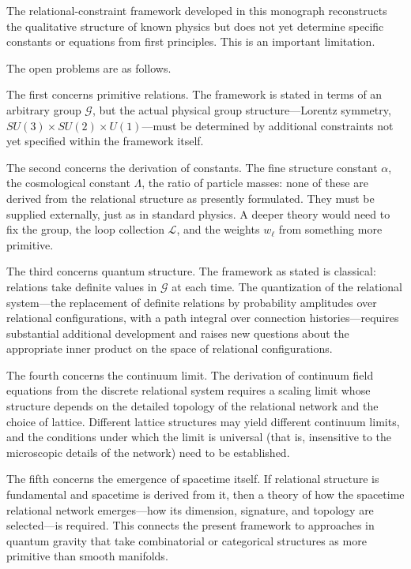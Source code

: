 \documentclass[12pt,a4paper,openany]{book}
\theoremstyle{plain}
\theoremstyle{definition}
\theoremstyle{remark}
\newcommand{\GG}{\mathcal{G}}
\begin{document}
The relational-constraint framework developed in this monograph reconstructs the qualitative structure of known physics but does not yet determine specific constants or equations from first principles. This is an important limitation.

The open problems are as follows.

The first concerns primitive relations. The framework is stated in terms of an arbitrary group $\GG$, but the actual physical group structure---Lorentz symmetry, $SU(3) \times SU(2) \times U(1)$---must be determined by additional constraints not yet specified within the framework itself.

The second concerns the derivation of constants. The fine structure constant $\alpha$, the cosmological constant $\Lambda$, the ratio of particle masses: none of these are derived from the relational structure as presently formulated. They must be supplied externally, just as in standard physics. A deeper theory would need to fix the group, the loop collection $\mathcal{L}$, and the weights $w_\ell$ from something more primitive.

The third concerns quantum structure. The framework as stated is classical: relations take definite values in $\GG$ at each time. The quantization of the relational system---the replacement of definite relations by probability amplitudes over relational configurations, with a path integral over connection histories---requires substantial additional development and raises new questions about the appropriate inner product on the space of relational configurations.

The fourth concerns the continuum limit. The derivation of continuum field equations from the discrete relational system requires a scaling limit whose structure depends on the detailed topology of the relational network and the choice of lattice. Different lattice structures may yield different continuum limits, and the conditions under which the limit is universal (that is, insensitive to the microscopic details of the network) need to be established.

The fifth concerns the emergence of spacetime itself. If relational structure is fundamental and spacetime is derived from it, then a theory of how the spacetime relational network emerges---how its dimension, signature, and topology are selected---is required. This connects the present framework to approaches in quantum gravity that take combinatorial or categorical structures as more primitive than smooth manifolds.
\end{document}
